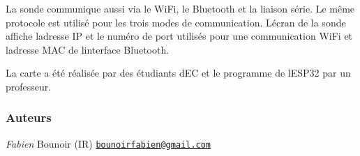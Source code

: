 La sonde communique aussi via le Wi\+Fi, le Bluetooth et la liaison série. Le même protocole est utilisé pour les trois modes de communication. L\textquotesingle{}écran de la sonde affiche l\textquotesingle{}adresse IP et le numéro de port utilisés pour une communication Wi\+Fi et l\textquotesingle{}adresse M\+AC de l\textquotesingle{}interface Bluetooth.

La carte a été réalisée par des étudiants d\textquotesingle{}EC et le programme de l\textquotesingle{}E\+S\+P32 par un professeur.



\subsubsection*{Auteurs}

{\itshape Fabien} Bounoir (IR) \href{mailto:bounoirfabien@gmail.com}{\tt bounoirfabien@gmail.\+com} 